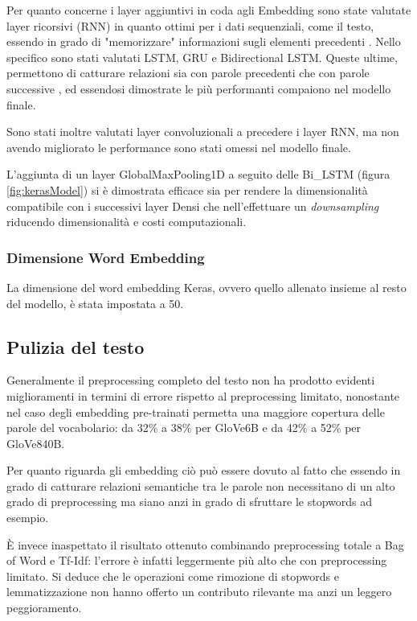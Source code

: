 Per quanto concerne i layer aggiuntivi in coda agli Embedding sono state
valutate layer ricorsivi (RNN) in quanto ottimi per i dati sequenziali, come il
testo, essendo in grado di "memorizzare" informazioni sugli elementi precedenti
\cite{liang2017text}. Nello specifico sono stati valutati LSTM, GRU e
Bidirectional LSTM. Queste ultime, permettono di catturare relazioni sia con
parole precedenti che con parole successive \cite{schuster1997bidirectional}, ed
essendosi dimostrate le più performanti compaiono nel modello finale.

Sono stati inoltre valutati layer convoluzionali a precedere i layer RNN, ma non
avendo migliorato le performance sono stati omessi nel modello finale.

L'aggiunta di un layer GlobalMaxPooling1D a seguito delle Bi\_LSTM (figura
\ref{fig:kerasModel}) si è dimostrata efficace sia per rendere la dimensionalità
compatibile con i successivi layer Densi che nell'effettuare un
\textit{downsampling} riducendo dimensionalità e costi computazionali.

\subsubsection{Dimensione Word Embedding}
La dimensione del word embedding Keras, ovvero quello allenato insieme al resto
del modello, è stata impostata a 50.

\subsection{Pulizia del testo}

Generalmente il preprocessing completo del testo non ha prodotto evidenti
miglioramenti in termini di errore rispetto al preprocessing limitato,
nonostante nel caso degli embedding pre-trainati permetta una maggiore copertura
delle parole del vocabolario: da 32\% a 38\% per GloVe6B e da 42\% a 52\% per
GloVe840B.

Per quanto riguarda gli embedding ciò può essere dovuto al fatto che essendo in
grado di catturare relazioni semantiche tra le parole non necessitano di un alto
grado di preprocessing ma siano anzi in grado di sfruttare le stopwords ad esempio.

È invece inaspettato il risultato ottenuto combinando preprocessing totale a Bag
of Word e Tf-Idf: l'errore è infatti leggermente più alto che con preprocessing
limitato. Si deduce che le operazioni come rimozione di stopwords e
lemmatizzazione non hanno offerto un contributo rilevante ma anzi un leggero
peggioramento. 


